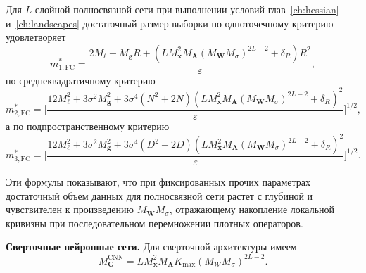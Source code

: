 \begin{corollary}
    \label{cor:scaling-fcnn-sizes}
    Для $L$-слойной полносвязной сети при выполнении условий глав~\ref{ch:hessian} и~\ref{ch:landscapes} достаточный размер выборки по одноточечному критерию удовлетворяет
    \begin{equation}
        \label{eq:scaling-fcnn-m1}
        m_{1, \mathrm{FC}}^*
        =
        \frac{
            2M_{\ell}
            +
            M_{\mathbf g}R
            +
            \left(
                L M_{\mathbf x}^2 M_{\mathbf A}(M_{\mathbf W}M_{\sigma})^{2L-2}
                +\delta_R
            \right)R^2
        }{\varepsilon},
    \end{equation}
    по среднеквадратичному критерию
    \begin{equation}
        \label{eq:scaling-fcnn-m2}
        m_{2, \mathrm{FC}}^*
        =
        \Bigg[
            \frac{
                12M_{\ell}^2
                +
                3\sigma^2 M_{\mathbf g}^2
                +
                3\sigma^4(N^2+2N)
                \left(
                    L M_{\mathbf x}^2 M_{\mathbf A}(M_{\mathbf W}M_{\sigma})^{2L-2}
                    +\delta_R
                \right)^2
            }{\varepsilon}
        \Bigg]^{1/2},
    \end{equation}
    а по подпространственному критерию
    \begin{equation}
        \label{eq:scaling-fcnn-m3}
        m_{3, \mathrm{FC}}^*
        =
        \Bigg[
            \frac{
                12M_{\ell}^2
                +
                3\sigma^2 M_{\mathbf g}^2
                +
                3\sigma^4(D^2+2D)
                \left(
                    L M_{\mathbf x}^2 M_{\mathbf A}(M_{\mathbf W}M_{\sigma})^{2L-2}
                    +\delta_R
                \right)^2
            }{\varepsilon}
        \Bigg]^{1/2}.
    \end{equation}
\end{corollary}

Эти формулы показывают, что при фиксированных прочих параметрах достаточный объем данных для полносвязной сети растет с глубиной и чувствителен к произведению $M_{\mathbf W}M_{\sigma}$, отражающему накопление локальной кривизны при последовательном перемножении плотных операторов.

\textbf{Сверточные нейронные сети.} Для сверточной архитектуры имеем
\begin{equation}
    M_{\mathbf G}^{\mathrm{CNN}}
    =
    L M_{\mathbf x}^2 M_{\mathbf A}K_{\max}(M_{\mathcal W}M_{\sigma})^{2L-2}.
\end{equation}

